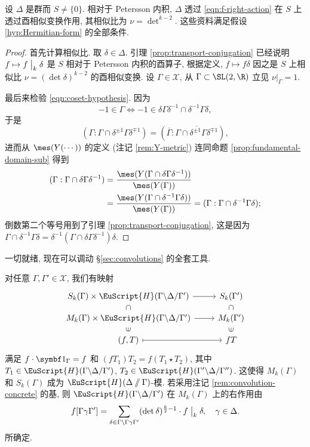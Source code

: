 \begin{proposition}\label{prop:modular-unitary-similitude}
	设 $\Delta$ 是群而 $S \neq \{0\}$. 相对于 Petersson 内积, $\Delta$ 透过 \eqref{eqn:f-right-action} 在 $S$ 上透过酉相似变换作用, 其相似比为 $\nu = \det^{k-2}$. 这些资料满足假设 \ref{hyp:Hermitian-form} 的全部条件.
\end{proposition}
\begin{proof}
	首先计算相似比. 取 $\delta \in \Delta$. 引理 \ref{prop:transport-conjugation} 已经说明 $f \mapsto f \;\big|_{k} \; \delta$ 是 $S$ 相对于 Petersson 内积的酉算子, 根据定义, $f \mapsto f\delta$ 因之是 $S$ 上相似比 $\nu = (\det\delta)^{k-2}$ 的酉相似变换. 设 $\Gamma \in \mathcal{X}$, 从 $\Gamma \subset \SL(2,\R)$ 立见 $\nu|_\Gamma = 1$.
	
	最后来检验 \eqref{eqn:coset-hypothesis}. 因为
	\[ -1 \in \Gamma \iff -1 \in \delta \Gamma \delta^{-1} \cap \delta^{-1} \Gamma \delta, \]
	于是
	\[ \left( \Gamma: \Gamma \cap \delta^{\pm 1}\Gamma\delta^{\mp 1} \right) = \left(\overline{\Gamma}: \overline{\Gamma \cap \delta^{\pm 1}\Gamma\delta^{\mp 1}} \right), \]
	进而从 $\mes(Y(\cdots))$ 的定义 (注记 \ref{rem:Y-metric}) 连同命题 \ref{prop:fundamental-domain-sub} 得到
	\begin{align*}
		(\Gamma: \Gamma \cap \delta\Gamma\delta^{-1}) & = \dfrac{\mes(Y(\Gamma \cap \delta\Gamma\delta^{-1}))}{\mes(Y(\Gamma))} \\
		& = \dfrac{\mes(Y(\Gamma \cap \delta^{-1}\Gamma\delta))}{\mes(Y(\Gamma))} = (\Gamma: \Gamma \cap \delta^{-1}\Gamma\delta);
	\end{align*}
	倒数第二个等号用到了引理 \ref{prop:transport-conjugation}, 这是因为 $\Gamma \cap \delta^{-1}\Gamma\delta = \delta^{-1} (\Gamma \cap \delta\Gamma\delta^{-1}) \delta$.
\end{proof}

一切就绪, 现在可以调动 \S\ref{sec:convolutions} 的全套工具.
\begin{proposition}
	对任意 $\Gamma, \Gamma' \in \mathcal{X}$, 我们有映射
	\[\begin{tikzcd}[row sep=small]
		S_k(\Gamma) \times \EuScript{H}(\Gamma \backslash \Delta / \Gamma') \arrow[r] \arrow[phantom, d, "\subset" sloped] & S_k(\Gamma') \arrow[phantom, d, "\subset" sloped] \\
		M_k(\Gamma) \times \EuScript{H}(\Gamma \backslash \Delta / \Gamma') \arrow[r] & M_k(\Gamma') \\
		(f, T) \arrow[mapsto, r] \arrow[phantom, u, "\in" sloped] & fT \arrow[phantom, u, "\in" sloped]
	\end{tikzcd}\]
	满足 $f \cdot \charfcn_\Gamma = f$ 和 $(f T_1) T_2 = f (T_1 \star T_2)$, 其中 $T_1 \in \EuScript{H}(\Gamma \backslash \Delta / \Gamma')$, $T_2 \in \EuScript{H}(\Gamma' \backslash \Delta / \Gamma'')$. 这使得 $M_k(\Gamma)$ 和 $S_k(\Gamma)$ 成为 $\EuScript{H}(\Delta \sslash \Gamma)$-模. 若采用注记 \ref{rem:convolution-concrete} 的基, 则 $\EuScript{H}(\Gamma \backslash \Delta / \Gamma')$ 在 $M_k(\Gamma)$ 上的右作用由
	\[ f [\Gamma \gamma \Gamma'] = \sum_{\delta \in \Gamma \backslash \Gamma\gamma\Gamma'} (\det\delta)^{\frac{k}{2} - 1} \cdot f \;\big|_{k} \; \delta, \quad \gamma \in \Delta. \]
	所确定.
\end{proposition}

